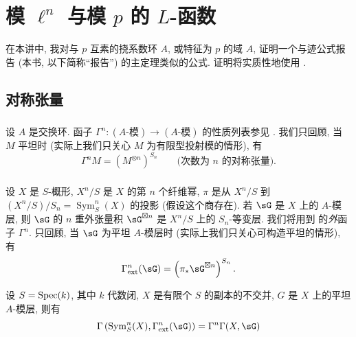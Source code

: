 
\chapter[模 \texorpdfstring{$\ell^n$}{l n} 与模 \texorpdfstring{$p$}{p} 的 \texorpdfstring{$L$}{L}-函数 {[Fonction L mod. \texorpdfstring{$\ell^n$}{l n}]}]{模 \texorpdfstring{$\ell^n$}{l n} 与模 \texorpdfstring{$p$}{p} 的 \texorpdfstring{$L$}{L}-函数}\label{III}

在本讲中, 我对与 $p$ 互素的挠系数环 $A$, 或特征为 $p$ 的域 $A$, 证明一个与迹公式报告 (本书, 以下简称“报告”) 的主定理类似的公式. 证明将实质性地使用 \cite[XVII 5.5]{sga4}.



\section{对称张量}\label{III:1}

\subsection{}\label{III:1-1}

设 $A$ 是交换环. 函子 $\Gamma^n:(\text{$A$-模})\to (\text{$A$-模})$ 的性质列表参见 \cite[XVII 5.5.1 及 2]{sga4}. 我们只回顾, 当 $M$ 平坦时 (实际上我们只关心 $M$ 为有限型投射模的情形), 有
\[
  \Gamma^n M = \left(M^{\otimes n}\right)^{S_n} \qquad \text{(次数为 $n$ 的对称张量).}
\]

\subsection{}\label{III:1-2}

设 $X$ 是 $S$-概形, $X^n/S$ 是 $X$ 的第 $n$ 个纤维幂, $\pi$ 是从 $X^n/S$ 到 $(X^n/S)/S_n=\operatorname{Sym}_S^n(X)$ 的投影 (假设这个商存在). 若 $\sG$ 是 $X$ 上的 $A$-模层, 则 $\sG$ 的 $n$ 重外张量积 $\sG^{\boxtimes n}$ 是 $X^n/S$ 上的 $S_n$-等变层. 我们将用到 \cite[XVII 5.5.7 至 9]{sga4} 的\emph{外}函子 $\Gamma^n$. 只回顾, 当 $\sG$ 为平坦 $A$-模层时 (实际上我们只关心可构造平坦的情形), 有
\[
  \Gamma_\text{ext}^n(\sG) = \left(\pi_*\sG^{\boxtimes n}\right)^{S_n} \text{.}
\]

\begin{lemma_}\label{III:1-3}
设 $S=\operatorname{Spec}(k)$, 其中 $k$ 代数闭, $X$ 是有限个 $S$ 的副本的不交并, $G$ 是 $X$ 上的平坦 $A$-模层, 则有
\[
  \Gamma\left(\operatorname{Sym}_S^n(X),\Gamma_\text{ext}^n(\sG)\right) = \Gamma^n \Gamma(X,\sG)
\]
\end{lemma_}

